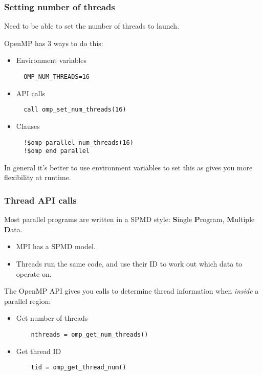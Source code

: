 \documentclass{beamer}
\begin{document}
\begin{frame}[fragile]
\frametitle{Setting number of threads}
Need to be able to set the number of threads to launch.

OpenMP has 3 ways to do this:
\begin{itemize}
  \item Environment variables
  \begin{verbatim}
  OMP_NUM_THREADS=16
  \end{verbatim}

  \item API calls
  \begin{verbatim}
  call omp_set_num_threads(16)
  \end{verbatim}

  \item Clauses
  \begin{verbatim}
  !$omp parallel num_threads(16)
  !$omp end parallel
  \end{verbatim}
\end{itemize}

In general it's better to use environment variables to set this as gives you more flexibility at runtime.
\end{frame}

\begin{frame}[fragile]
\frametitle{Thread API calls}
Most parallel programs are written in a SPMD style: {\bf S}ingle {\bf P}rogram, {\bf M}ultiple {\bf D}ata.
\begin{itemize}
  \item MPI has a SPMD model.
  \item Threads run the same code, and use their ID to work out which data to operate on.
\end{itemize}

The OpenMP API gives you calls to determine thread information when \emph{inside} a parallel region:
\begin{itemize}
  \item Get number of threads
    \begin{verbatim}
    nthreads = omp_get_num_threads()
    \end{verbatim}

  \item Get thread ID
    \begin{verbatim}
    tid = omp_get_thread_num()
    \end{verbatim}

\end{itemize}
\end{frame}
\end{document}
